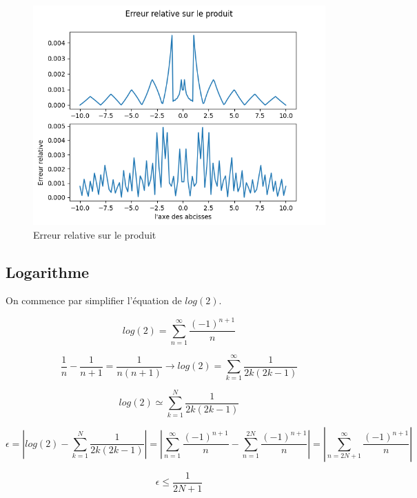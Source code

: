 \documentclass{article}
\begin{document}
\begin{figure}[ht]
    \centering
    \includegraphics[scale=0.6]{erreur_prod.png}
    \caption{Erreur relative sur le produit}
    \label{fig:erreur_prod}
\end{figure}


\subsection*{Logarithme}

On commence par simplifier l'équation de $log(2)$.

\begin{equation}
log(2) = \sum_{n=1}^{\infty}\frac{(-1)^{n+1}}{n}
\end{equation}

\begin{equation}
\frac{1}{n}-\frac{1}{n+1}=\frac{1}{n(n+1)} \rightarrow log(2) = \sum_{k=1}^{\infty}\frac{1}{2k(2k-1)}
\end{equation}

\begin{equation}
log(2) \simeq \sum_{k=1}^{N}\frac{1}{2k(2k-1)}
\end{equation}

\begin{equation}
\epsilon
=
\left |  
log(2)-
\sum_{k=1}^{N}\frac{1}{2k(2k-1)}
\right |
=
\left |  
\sum_{n=1}^{\infty}\frac{(-1)^{n+1}}{n}-
\sum_{n=1}^{2N}\frac{(-1)^{n+1}}{n}
\right |
=
\left |  
\sum_{n=2N+1}^{\infty}\frac{(-1)^{n+1}}{n}
\right |
\end{equation}

\begin{equation}
    \epsilon \leq \frac{1}{2N+1} 
\end{equation}
\end{document}

